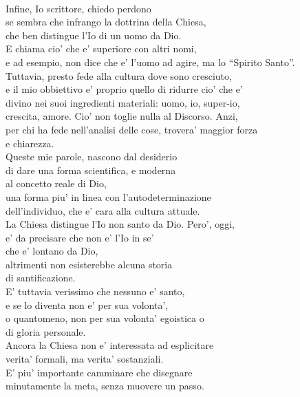 \begin{haiku}
    \leavevmode\\
    Infine, Io scrittore, chiedo perdono \\
    se sembra che infrango la dottrina della Chiesa,\\
    che ben distingue l'Io di un uomo da Dio. \\
    E chiama cio' che e' superiore con altri nomi, \\
    e ad esempio, non dice  che e' l'uomo ad agire, ma lo ``Spirito Santo''.\\
    Tuttavia, presto fede alla cultura dove sono cresciuto,\\
    e il mio obbiettivo e' proprio quello di ridurre cio' che e'\\
    divino nei suoi ingredienti materiali: uomo, io, super-io, \\
    crescita, amore. Cio' non toglie nulla al Discorso. Anzi,\\ 
    per chi ha fede nell'analisi delle cose, trovera' maggior forza\\
    e chiarezza.\\
    Queste mie parole, nascono dal desiderio \\
    di dare una forma scientifica, e moderna \\
    al concetto reale di Dio,\\
    una forma piu' in linea con l'autodeterminazione\\
    dell'individuo, che e' cara alla cultura attuale.\\
    La Chiesa distingue l'Io non santo da Dio. Pero', oggi,\\
    e' da precisare che non e' l'Io in se'\\
    che e' lontano da Dio,\\
    altrimenti non esisterebbe alcuna storia\\
    di santificazione.\\
    E' tuttavia verissimo che nessuno e' santo,\\
    e se lo diventa non e' per sua volonta',\\
    o quantomeno, non per sua volonta' egoistica o \\
    di gloria personale.\\
    Ancora la Chiesa non e' interessata ad esplicitare\\
    verita' formali, ma verita' sostanziali.\\
    E' piu' importante camminare che disegnare \\
    minutamente la meta, senza muovere un passo.\\

\end{haiku}
